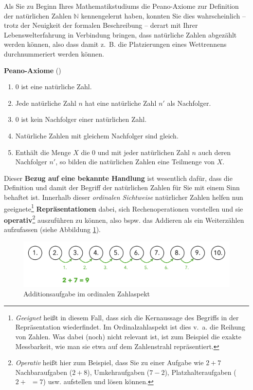 \documentclass[
]{scrbook}
\providecommand{\tightlist}{%
  \setlength{\itemsep}{0pt}\setlength{\parskip}{0pt}}
\renewenvironment{quote}{
  \list{}{
	\leftmargin0.2cm   %
    \rightmargin\leftmargin
      	\def\FrameCommand
    {%
        {\color{quoteColor}\vrule width 2pt}%
        \hspace{0pt}%
    }%
    \MakeFramed{\advance \hsize -\width \FrameRestore}    \color{quoteColor}
    }
  \item\relax
}
{\endlist\color{black}\endMakeFramed}
\theoremstyle{definition}
\theoremstyle{definition}
\theoremstyle{definition}
\theoremstyle{definition}
\theoremstyle{remark}
\begin{document}
Als Sie zu Beginn Ihres Mathematikstudiums die Peano-Axiome zur Definition der natürlichen Zahlen \(\mathbb{N}\) kennengelernt haben, konnten Sie dies wahrscheinlich -- trotz der Neuigkeit der formalen Beschreibung -- derart mit Ihrer Lebenswelterfahrung in Verbindung bringen, dass natürliche Zahlen abgezählt werden können, also dass damit z.~B. die Platzierungen eines Wettrennens durchnummeriert werden können.

\begin{quote}
\textbf{Peano-Axiome} ()

\begin{enumerate}
\def\labelenumi{\arabic{enumi}.}
\tightlist
\item
  \(0\) ist eine natürliche Zahl.
\item
  Jede natürliche Zahl \(n\) hat eine natürliche Zahl \(n'\) als Nachfolger.
\item
  \(0\) ist kein Nachfolger einer natürlichen Zahl.
\item
  Natürliche Zahlen mit gleichem Nachfolger sind gleich.
\item
  Enthält die Menge \(X\) die \(0\) und mit jeder natürlichen Zahl \(n\) auch deren Nachfolger \(n'\), so bilden die natürlichen Zahlen eine Teilmenge von \(X\).
\end{enumerate}
\end{quote}

Dieser \textbf{Bezug auf eine bekannte Handlung} ist wesentlich dafür, dass die Definition und damit der Begriff der natürlichen Zahlen für Sie mit einem Sinn behaftet ist. Innerhalb dieser \emph{ordinalen Sichtweise} natürlicher Zahlen helfen nun geeignete\footnote{\emph{Geeignet} heißt in diesem Fall, dass sich die Kernaussage des Begriffs in der Repräsentation wiederfindet. Im Ordinalzahlaspekt ist dies v.~a. die Reihung von Zahlen. Was dabei (noch) nicht relevant ist, ist zum Beispiel die exakte Messbarkeit, wie man sie etwa auf dem Zahlenstrahl repräsentiert.} \textbf{Repräsentationen} dabei, sich Rechenoperationen vorstellen und sie \textbf{operativ}\footnote{\emph{Operativ} heißt hier zum Beispiel, dass Sie zu einer Aufgabe wie \(2+7\) Nachbaraufgaben (\(2+8\)), Umkehraufgaben (\(7-2\)), Platzhalteraufgaben (\(2+\boxed{\phantom{5}}=7\)) usw. aufstellen und lösen können.} auszuführen zu können, also bspw. das Addieren als ein Weiterzählen aufzufassen (siehe Abbildung \ref{fig:Addition}).

\begin{figure}

{\centering \includegraphics[width=0.75\linewidth]{pictures/4-Addition} 

}

\caption{Additionsaufgabe im ordinalen Zahlaspekt}\label{fig:Addition}
\end{figure}
\end{document}
